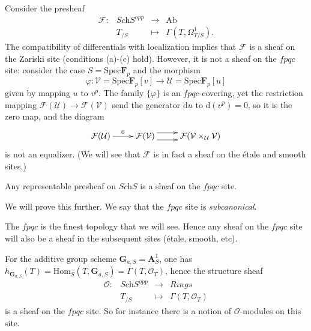 \begin{example}
Consider the presheaf 
$$
\begin{array}{rccl}
\mathcal{F} : & \textit{Sch}S^{opp} & \to & \text{Ab} \\
& T_{/S} & \mapsto & \Gamma(T, \Omega^1_{T/S}).
\end{array}
$$
The compatibility of differentials with localization implies that $\mathcal{F}$ is a sheaf on the Zariski site (conditions (a)-(c) hold). However, it is not a sheaf on the $fpqc$ site: consider the case $S = \text{Spec} \mathbf{F}_p$ and the morphism 
$$
\varphi: \mathcal{V} = \text{Spec} \mathbf{F}_p[v] \to \mathcal{U} = \text{Spec} \mathbf{F}_p[u]
$$
given by mapping $u$ to $v^p$. The family $\{\varphi \}$ is an $fpqc$-covering, yet the restriction mapping $\mathcal{F}(\mathcal{U}) \to \mathcal{F}(\mathcal{V})$ send the generator $\mathrm{d} u$ to $\mathrm{d}(v^p) = 0$, so it is the zero map, and the diagram
$$
\xymatrix{
\mathcal{F}(\mathcal{U}) \ar[r]^{0} &
\mathcal{F}(\mathcal{V}) \ar@<1ex>[r] \ar@<-1ex>[r] &
\mathcal{F}(\mathcal{V} \times_\mathcal{U} \mathcal{V})
}
$$
is not an equalizer. (We will see that $\mathcal{F}$ is in fact a sheaf on the \'etale and smooth sites.)
\end{example}

\begin{lemma}
Any representable presheaf on $\textit{Sch}S$ is a sheaf on the $fpqc$ site.
\end{lemma}

We will prove this further. We say that the $fpqc$ site is \emph{subcanonical}.

\begin{remark}
The $fpqc$ is the finest topology that we will see. Hence any sheaf on the $fpqc$ site will also be a sheaf in the subsequent sites (\'etale, smooth, etc).
\end{remark}

\begin{example}
For the additive group scheme $\mathbf{G}_{a,S} = \mathbf{A}^1_S$, one has $h_{\mathbf{G}_{a,S}} (T) = \text{Hom}_S (T,\mathbf{G}_{a,S}) = \Gamma(T,\mathcal{O}_T)$, hence the structure sheaf
$$
\begin{array}{rccl}
\mathcal{O} : & \textit{Sch}S^{opp} & \to & \textit{Rings} \\
& T_{/S} & \mapsto & \Gamma(T, \mathcal{O}_{T})
\end{array}
$$
is a sheaf on the $fpqc$ site. So for instance there is a notion of $\mathcal{O}$-modules on this site.
\end{example}

